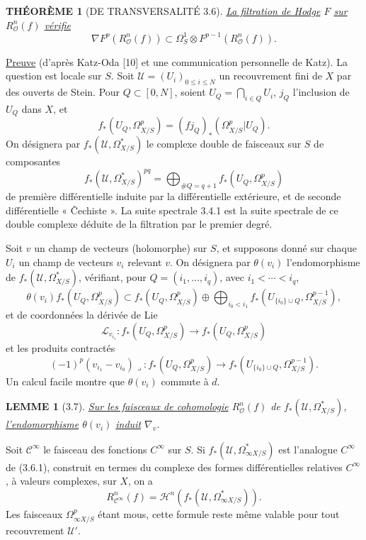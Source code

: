 \documentclass[10pt,leqno]{article}
\newcommand{\cO}{\mathcal O}
\newcommand{\cU}{\mathcal U}
\newcommand{\cC}{\mathcal C}
\theoremstyle{deligne}
\newtheorem*{theoreme}{THÉORÈME}
\newtheorem*{lemme}{LEMME}
\renewcommand{\underline}[1]{\uline{#1}}
\begin{document}
\begin{theoreme}[DE TRANSVERSALITÉ 3.6]
\underline{La filtration de Hodge} $F$ \underline{sur} $R_\cO^n(f)$ \underline{vérifie}
\[
\nabla F^p(R_\cO^n(f))\subset \Omega_S^1\otimes F^{p-1}(R_\cO^n(f)).
\]
\end{theoreme}

\underline{Preuve} (d'après Katz-Oda [10] et une communication personnelle de Katz). La question est locale sur $S$. Soit $\cU=(U_i)_{0\le i\le N}$ un recouvrement fini de $X$ par des ouverts de Stein. Pour $Q\subset[0,N]$, soient $U_Q=\bigcap_{i\in Q}U_i$, $j_Q$ l'inclusion de $U_Q$ dans $X$, et
\[
f_*(U_Q,\Omega^p_{X/S})=(fj_Q)_*(\Omega^p_{X/S}|U_Q).
\]
On désignera par $f_*(\cU,\Omega^*_{X/S})$ le complexe double de faisceaux sur $S$ de composantes
\begin{equation}
f_*(\cU,\Omega^*_{X/S})^{pq}=\bigoplus_{\#Q=q+1} f_*(U_Q,\Omega^p_{X/S})
\tag{3.6.1}
\end{equation}
de première différentielle induite par la différentielle extérieure, et de seconde différentielle « Čechiste ». La suite spectrale 3.4.1 est la suite spectrale de ce double complexe déduite de la filtration par le premier degré.

Soit $v$ un champ de vecteurs (holomorphe) sur $S$, et supposons donné sur chaque $U_i$ un champ de vecteurs $v_i$ relevant $v$. On désignera par $\theta(v_i)$ l'endomorphisme de $f_*(\cU,\Omega^*_{X/S})$, vérifiant, pour $Q=(i_1,\ldots,i_q)$, avec $i_1<\cdots<i_q$,
\[
\theta(v_i) f_*(U_Q,\Omega^p_{X/S})
\subset
f_*(U_Q,\Omega^p_{X/S})
\oplus
\bigoplus_{i_0<i_1} f_*(U_{\{i_0\}\cup Q},\Omega^{p-1}_{X/S}),
\]
et de coordonnées la dérivée de Lie
\[
\mathcal L_{v_{i_1}}:f_*(U_Q,\Omega^p_{X/S})\longrightarrow f_*(U_Q,\Omega^p_{X/S})
\]
et les produits contractés
\[
(-1)^p(v_{i_1}-v_{i_0})\lrcorner:
 f_*(U_Q,\Omega^p_{X/S})\longrightarrow f_*(U_{\{i_0\}\cup Q},\Omega^{p-1}_{X/S}).
\]
Un calcul facile montre que $\theta(v_i)$ commute à $d$.

\begin{lemme}[3.7]
\underline{Sur les faisceaux de cohomologie} $R_\cO^n(f)$ de $f_*(\cU,\Omega^*_{X/S})$, \underline{l'endomorphisme} $\theta(v_i)$ \underline{induit} $\nabla_v$.
\end{lemme}

Soit $\cC^\infty$ le faisceau des fonctions $C^\infty$ sur $S$. Si $f_*(\cU,\Omega^*_{\infty X/S})$ est l'analogue $C^\infty$ de (3.6.1), construit en termes du complexe des formes différentielles relatives $C^\infty$, à valeurs complexes, sur $X$, on a
\[
R_{\cC^\infty}^n(f)=\mathcal H^n(f_*(\cU,\Omega^*_{\infty X/S})).
\]
Les faisceaux $\Omega^p_{\infty X/S}$ étant mous, cette formule reste même valable pour tout recouvrement $\cU'$.
\end{document}
